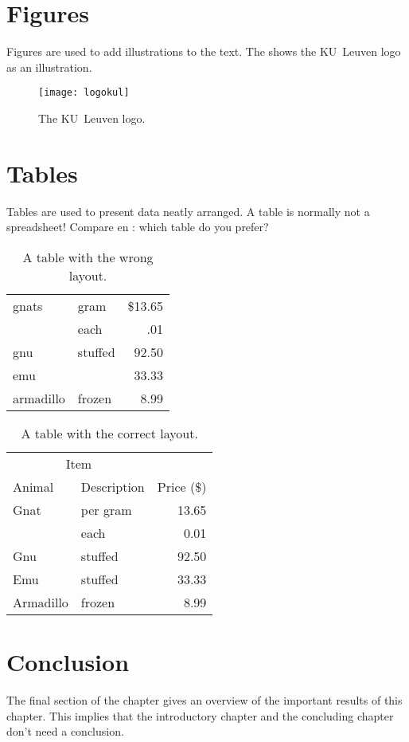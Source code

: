 \section{Figures}
Figures are used to add illustrations to the text. The  shows
the KU~Leuven logo as an illustration.
\begin{figure}
  \centering
  \texttt{[image: logokul]}
  \caption{The KU~Leuven logo.}
  \label{fig:logo}
\end{figure}

\section{Tables}
Tables are used to present data neatly arranged. A table is normally
not a spreadsheet! Compare  en : which table do
you prefer?

\begin{table}
  \centering
  \begin{tabular}{||l|lr||} \hline
    gnats     & gram      & \$13.65 \\ \cline{2-3}
              & each      & .01 \\ \hline
    gnu       & stuffed   & 92.50 \\ \cline{1-1} \cline{3-3}
    emu       &           & 33.33 \\ \hline
    armadillo & frozen    & 8.99 \\ \hline
  \end{tabular}
  \caption{A table with the wrong layout.}
  \label{tab:wrong}
\end{table}

\begin{table}
  \centering
  \begin{tabular}{@{}llr@{}} \toprule
    \multicolumn{2}{c}{Item} \\ \cmidrule(r){1-2}
    Animal    & Description & Price (\$)\\ \midrule
    Gnat      & per gram    & 13.65 \\
              & each        & 0.01 \\
    Gnu       & stuffed     & 92.50 \\
    Emu       & stuffed     & 33.33 \\
    Armadillo & frozen      & 8.99 \\ \bottomrule
  \end{tabular}
  \caption{A table with the correct layout.}
  \label{tab:ok}
\end{table}


\section{Conclusion}
The final section of the chapter gives an overview of the important results
of this chapter. This implies that the introductory chapter and the
concluding chapter don't need a conclusion.



